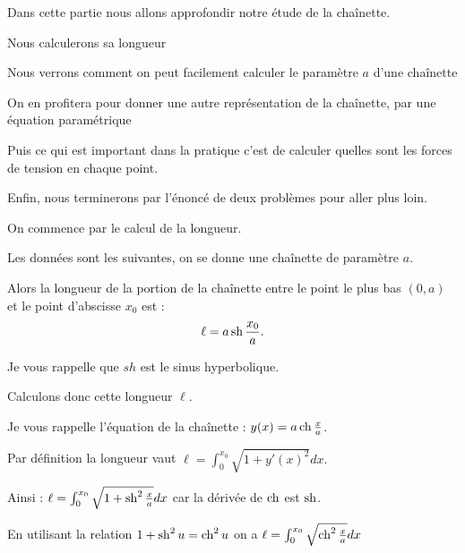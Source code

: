 







\debuttexte


\diapo

\change
Dans cette partie nous allons approfondir notre étude de la chaînette.

\change
Nous calculerons sa longueur

\change
Nous verrons comment on peut facilement calculer le paramètre $a$ d'une chaînette

\change
On en profitera pour donner une autre représentation de la chaînette,
par une équation paramétrique

\change
Puis ce qui est important dans la pratique c'est de calculer
quelles sont les forces de tension en chaque point.

\change
Enfin, nous terminerons par l'énoncé de deux problèmes pour aller plus loin.


\diapo

On commence par le calcul de la longueur.

Les données sont les suivantes, on se donne une chaînette
de paramètre $a$.


Alors la longueur de la portion de la chaînette  
entre le point le plus bas $(0,a)$ et le point d'abscisse $x_0$ est :
$$\ell = a \mathop{\mathrm{sh}}\nolimits \frac{x_0}{a}.$$

Je vous rappelle que $sh$ est le sinus hyperbolique.




\diapo

Calculons donc cette longueur $\ell$.

\change
Je vous rappelle l'équation de la chaînette : $y(x) =a \mathop{\mathrm{ch}}\nolimits \frac x a$.

\change
Par définition la longueur vaut
$\ell = \int_0^{x_0} \sqrt{1+y'(x)^2} dx.$

\change
Ainsi :
 $\ell = \int_0^{x_0} \sqrt{1+\mathop{\mathrm{sh}}\nolimits^2 \tfrac x a} dx$
 car la dérivée de $\mathop{\mathrm{ch}}\nolimits$ est $\mathop{\mathrm{sh}}\nolimits$.
 
 \change
 En utilisant la relation $1+\mathop{\mathrm{sh}}\nolimits^2 u = \mathop{\mathrm{ch}}\nolimits^2 u$
 on a $\ell = \int_0^{x_0} \sqrt{\mathop{\mathrm{ch}}\nolimits^2 \tfrac x a} dx$
 
